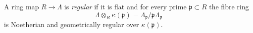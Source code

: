 \begin{definition}
\label{definition-regular}
A ring map $R \to \Lambda$ is {\it regular} if it is flat and
for every prime $\mathfrak p \subset R$ the fibre ring
$$
\Lambda \otimes_R \kappa(\mathfrak p) =
\Lambda_\mathfrak p/\mathfrak p\Lambda_\mathfrak p
$$
is Noetherian and geometrically regular over $\kappa(\mathfrak p)$.
\end{definition}